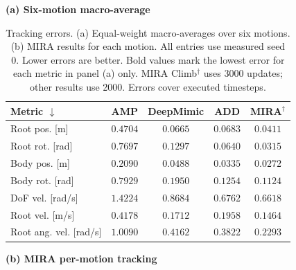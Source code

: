 \begin{table}[!t]
\caption{Tracking errors. (a) Equal-weight
macro-averages over six motions. (b) MIRA results for each motion.
All entries use measured seed 0. Lower errors are better.
Bold values mark the lowest error for each metric in panel (a) only.
MIRA Climb$^\dagger$ uses 3000 updates; other results use 2000.
Errors cover executed timesteps.}
\label{tab:main}
\centering\small
\setlength{\tabcolsep}{8pt}
\textbf{(a) Six-motion macro-average}\\[2pt]
\begin{tabular}{lcccc}\toprule
Metric $\downarrow$ & AMP & DeepMimic & ADD & MIRA$^\dagger$ \\
\midrule
Root pos. [m] & $0.4704$ & $0.0665$ & $0.0683$ & $\mathbf{0.0411}$ \\
Root rot. [rad] & $0.7697$ & $0.1297$ & $0.0640$ & $\mathbf{0.0315}$ \\
Body pos. [m] & $0.2090$ & $0.0488$ & $0.0335$ & $\mathbf{0.0272}$ \\
Body rot. [rad] & $0.7929$ & $0.1950$ & $0.1254$ & $\mathbf{0.1124}$ \\
DoF vel. [rad/s] & $1.4224$ & $0.8684$ & $0.6762$ & $\mathbf{0.6618}$ \\
Root vel. [m/s] & $0.4178$ & $0.1712$ & $0.1958$ & $\mathbf{0.1464}$ \\
Root ang. vel. [rad/s] & $1.0090$ & $0.4162$ & $0.3822$ & $\mathbf{0.2293}$ \\
\bottomrule\end{tabular}
\par\vspace{5pt}
\textbf{(b) MIRA per-motion tracking}\\[2pt]
\scriptsize
\setlength{\tabcolsep}{3.5pt}
\end{table}
